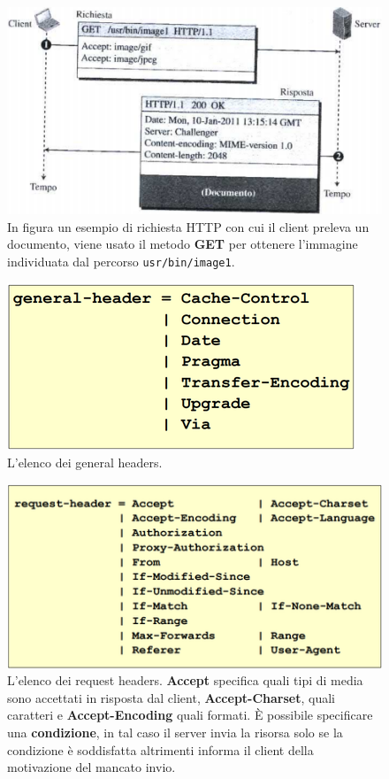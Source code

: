 \documentclass[11pt,a4paper,oneside]{book}
\theoremstyle{definition}
\begin{document}
\begin{figure}[!h]
	\includegraphics[scale=0.2]{Immagini/HTTP_get.png}
	\centering
	\caption{In figura un esempio di richiesta HTTP con cui il client preleva un documento, viene usato il metodo \textbf{GET} per ottenere l'immagine individuata dal percorso \texttt{usr/bin/image1}.}
\end{figure}
\begin{figure}[!h]
	\includegraphics[scale=0.4]{Immagini/General_h.png}
	\centering
	\caption{L'elenco dei general headers.}
\end{figure}
\begin{figure}[!h]
	\includegraphics[scale=0.5]{Immagini/Req_h.png}
	\centering
	\caption{L'elenco dei request headers. \textbf{Accept} specifica quali tipi di media sono accettati in risposta dal client, \textbf{Accept-Charset}, quali caratteri e \textbf{Accept-Encoding} quali formati. È possibile specificare una \textbf{condizione}, in tal caso il server invia la risorsa solo se la condizione è soddisfatta altrimenti informa il client della motivazione del mancato invio.}
\end{figure}
\end{document}
